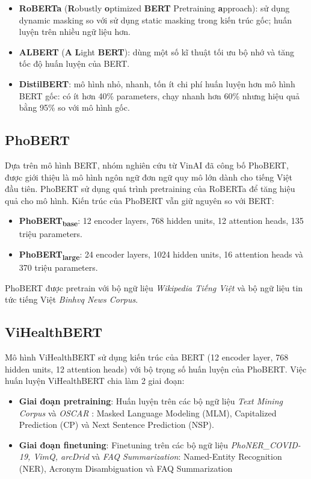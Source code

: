 \begin{itemize}
\item \textbf{RoBERTa} (\textbf{R}obustly \textbf{o}ptimized \textbf{BERT} Pretraining \textbf{a}pproach)\cite{DBLP:journals/corr/abs-1907-11692}: sử dụng dynamic masking so với sử dụng static masking trong kiến trúc gốc; huấn luyện trên nhiều ngữ liệu hơn.
\item \textbf{ALBERT} (\textbf{A} \textbf{L}ight \textbf{BERT})\cite{https://doi.org/10.48550/arxiv.1909.11942}: dùng một số kĩ thuật tối ưu bộ nhớ và tăng tốc độ huấn luyện của BERT.
\item \textbf{DistilBERT}\cite{DBLP:journals/corr/abs-1910-01108}: mô hình nhỏ, nhanh, tốn ít chi phí huấn luyện hơn mô hình BERT gốc: có ít hơn 40\% parameters, chạy nhanh hơn 60\% nhưng hiệu quả bằng 95\% so với mô hình gốc.
\end{itemize}

\subsection{PhoBERT}
Dựa trên mô hình BERT, nhóm nghiên cứu từ VinAI đã công bố PhoBERT\cite{phobert}, được giới thiệu là mô hình ngôn ngữ đơn ngữ quy mô lớn dành cho tiếng Việt đầu tiên. PhoBERT sử dụng quá trình pretraining của RoBERTa để tăng hiệu quả cho mô hình. Kiến trúc của PhoBERT vẫn giữ nguyên so với BERT:
\begin{itemize}
\item \textbf{PhoBERT\textsubscript{base}}: 12 encoder layers, 768 hidden units, 12 attention heads, 135 triệu parameters.
\item \textbf{PhoBERT\textsubscript{large}}: 24 encoder layers, 1024 hidden units, 16 attention heads và 370 triệu parameters.
\end{itemize}
PhoBERT được pretrain với bộ ngữ liệu \textit{Wikipedia Tiếng Việt} và bộ ngữ liệu tin tức tiếng Việt \textit{Binhvq News Corpus}.

\subsection{ViHealthBERT}
Mô hình ViHealthBERT sử dụng kiến trúc của BERT (12 encoder layer, 768 hidden units, 12 attention heads) với bộ trọng số huấn luyện của PhoBERT. Việc huấn luyện ViHealthBERT chia làm 2 giai đoạn:
\begin{itemize}
\item \textbf{Giai đoạn pretraining}: Huấn luyện trên các bộ ngữ liệu \textit{Text Mining Corpus} và \textit{OSCAR} : Masked Language Modeling (MLM), Capitalized Prediction (CP) và Next Sentence Prediction (NSP).
\item \textbf{Giai đoạn finetuning}: Finetuning trên các bộ ngữ liệu \textit{PhoNER\_COVID-19, VimQ, arcDrid} và \textit{FAQ Summarization}: Named-Entity Recognition (NER), Acronym Disambiguation và FAQ Summarization
\end{itemize}

